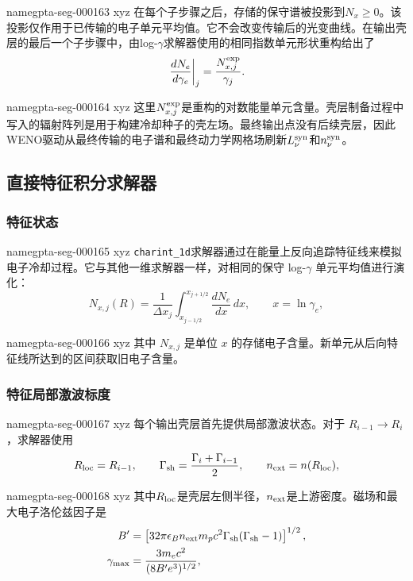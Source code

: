\documentclass[twocolumn]{aastex702}
\makeatletter
\providecommand{\gptareaderanchor}[1]{\pdfdest name{#1} xyz}%
\providecommand{\gptareaderanchor}[1]{\special{pdf:dest (#1) [ @thispage /XYZ @xpos @ypos null ]}}%
\makeatother
\begin{document}
\gptareaderanchor{gpta-seg-000163}%
在每个子步骤之后，存储的保守谱被投影到\(N_x\ge0\)。该投影仅作用于已传输的电子单元平均值。它不会改变传输后的光变曲线。在输出壳层的最后一个子步骤中，由log-\(\gamma\)求解器使用的相同指数单元形状重构给出了
\begin{equation}
\left.\frac{dN_e}{d\gamma_e}\right|_j
=\frac{N_{x,j}^{\rm exp}}{\gamma_j}.
\end{equation}

\gptareaderanchor{gpta-seg-000164}%
这里\(N_{x,j}^{\rm exp}\)是重构的对数能量单元含量。壳层制备过程中写入的辐射阵列是用于构建冷却种子的壳左场。最终输出点没有后续壳层，因此WENO驱动从最终传输的电子谱和最终动力学网格场刷新\(L_\nu^{\rm syn}\)和\(n_\nu^{\rm syn}\)。

\subsection{直接特征积分求解器}

\subsubsection{特征状态}


\gptareaderanchor{gpta-seg-000165}%
\texttt{charint\_1d}求解器通过在能量上反向追踪特征线来模拟电子冷却过程。它与其他一维求解器一样，对相同的保守 log-\(\gamma\) 单元平均值进行演化：
\begin{equation}
N_{x,j}(R)=\frac{1}{\Delta x_j}
\int_{x_{j-1/2}}^{x_{j+1/2}}\frac{dN_e}{dx}\,dx,
\qquad x=\ln\gamma_e,
\end{equation}

\gptareaderanchor{gpta-seg-000166}%
其中 \(N_{x,j}\) 是单位 \(x\) 的存储电子含量。新单元从后向特征线所达到的区间获取旧电子含量。

\subsubsection{特征局部激波标度}


\gptareaderanchor{gpta-seg-000167}%
每个输出壳层首先提供局部激波状态。对于 \(R_{i-1}\rightarrow R_i\)，求解器使用
\begin{equation}
R_{\rm loc}=R_{i-1},\qquad
\Gamma_{\rm sh}=\frac{\Gamma_i+\Gamma_{i-1}}{2},\qquad
n_{\rm ext}=n(R_{\rm loc}),
\end{equation}

\gptareaderanchor{gpta-seg-000168}%
其中\(R_{\rm loc}\)是壳层左侧半径，\(n_{\rm ext}\)是上游密度。磁场和最大电子洛伦兹因子是
\begin{equation}
\begin{aligned}
B'&=\left[32\pi\epsilon_B n_{\rm ext}m_pc^2
\Gamma_{\rm sh}(\Gamma_{\rm sh}-1)\right]^{1/2},\\
\gamma_{\max}&=\frac{3m_ec^2}{(8B'e^3)^{1/2}},
\end{aligned}
\end{equation}
\end{document}
